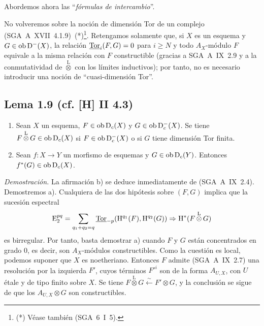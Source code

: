 Abordemos ahora las ``\emph{fórmulas de intercambio}''.

No volveremos sobre la noción de dimensión Tor de un complejo (SGA~A~XVII~4.1.9)~(*)\footnote{(*) Véase también (SGA~6~I~5).}. Retengamos solamente que, si $X$ es un esquema y $G \in \operatorname{ob} \mathrm{D}^{-}(X)$, la relación $\underline{\operatorname{Tor}}_i(F,G) = 0$ para $i \geqslant N$ y todo $A_X$-módulo $F$ equivale a la misma relación con $F$ constructible (gracias a SGA~A~IX~2.9 y a la conmutatividad de $\mathop{\otimes}\limits^{\mathrm{L}}$ con los límites inductivos); por tanto, no es necesario introducir una noción de ``cuasi-dimensión Tor''.

\subsection*{Lema 1.9 (cf. [H] II 4.3)}
\begin{enumerate}
\item[a)] Sean $X$ un esquema, $F \in \operatorname{ob} \mathrm{D}_c(X)$ y $G \in \operatorname{ob} \mathrm{D}_c^{-}(X)$. Se tiene $F \mathop{\otimes}\limits^{\mathrm{L}} G \in \operatorname{ob} \mathrm{D}_c(X)$ si $F \in \operatorname{ob} \mathrm{D}_c^{-}(X)$ o si $G$ tiene dimensión Tor finita.
\item[b)] Sean $f : X \to Y$ un morfismo de esquemas y $G \in \operatorname{ob} \mathrm{D}_c(Y)$. Entonces $f^{*}(G) \in \operatorname{ob} \mathrm{D}_c(X)$.
\end{enumerate}

\emph{Demostración.} La afirmación b) se deduce inmediatamente de (SGA~A~IX~2.4). Demostremos a). Cualquiera de las dos hipótesis sobre $(F,G)$ implica que la sucesión espectral
\[
\mathrm{E}_2^{pq} = \sum_{q_1+q_2=q} \underline{\operatorname{Tor}}_{-p}(\mathrm{H}^{q_1}(F), \mathrm{H}^{q_2}(G)) \Rightarrow \mathrm{H}^{*}(F \mathop{\otimes}\limits^{\mathrm{L}} G)
\]
es birregular. Por tanto, basta demostrar a) cuando $F$ y $G$ están concentrados en grado $0$, es decir, son $A_X$-módulos constructibles. Como la cuestión es local, podemos suponer que $X$ es noetheriano. Entonces $F$ admite (SGA~A~IX~2.7) una resolución por la izquierda $F'$, cuyos términos $F'^i$ son de la forma $A_{U,X}$, con $U$ étale y de tipo finito sobre $X$. Se tiene $F \mathop{\otimes}\limits^{\mathrm{L}} G \xleftarrow{\sim} F' \otimes G$, y la conclusión se sigue de que los $A_{U,X} \otimes G$ son constructibles.
